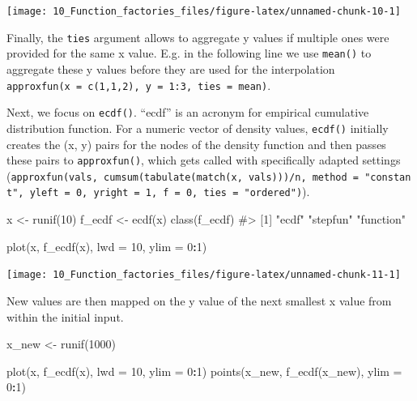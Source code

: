 \documentclass[
]{krantz}
\makeatletter
\newenvironment{Shaded}{\begin{snugshade}}{\end{snugshade}}
\newcommand{\CommentTok}[1]{\textcolor[rgb]{0.56,0.35,0.01}{\textit{#1}}}
\newcommand{\DataTypeTok}[1]{\textcolor[rgb]{0.13,0.29,0.53}{#1}}
\newcommand{\DecValTok}[1]{\textcolor[rgb]{0.00,0.00,0.81}{#1}}
\newcommand{\KeywordTok}[1]{\textcolor[rgb]{0.13,0.29,0.53}{\textbf{#1}}}
\newcommand{\NormalTok}[1]{#1}
\newcommand{\OperatorTok}[1]{\textcolor[rgb]{0.81,0.36,0.00}{\textbf{#1}}}
\newcommand{\StringTok}[1]{\textcolor[rgb]{0.31,0.60,0.02}{#1}}
\newenvironment{kframe}{%
\medskip{}
\setlength{\fboxsep}{.8em}
 \def\at@end@of@kframe{}%
 \ifinner\ifhmode%
  \def\at@end@of@kframe{\end{minipage}}%
  \begin{minipage}{\columnwidth}%
 \fi\fi%
 \def\FrameCommand##1{\hskip\@totalleftmargin \hskip-\fboxsep
 \colorbox{shadecolor}{##1}\hskip-\fboxsep
     \hskip-\linewidth \hskip-\@totalleftmargin \hskip\columnwidth}%
 \MakeFramed {\advance\hsize-\width
   \@totalleftmargin\z@ \linewidth\hsize
   \@setminipage}}%
 {\par\unskip\endMakeFramed%
 \at@end@of@kframe}
\renewenvironment{Shaded}{\begin{kframe}}{\end{kframe}}
\renewcommand{\KeywordTok} [1]{\textcolor[rgb]{0.00,0.44,0.13}{{#1}}}
\renewcommand{\DataTypeTok}[1]{\textcolor[rgb]{0.56,0.13,0.00}{{#1}}}
\renewcommand{\DecValTok}  [1]{\textcolor[rgb]{0.25,0.63,0.44}{{#1}}}
\renewcommand{\StringTok}  [1]{\textcolor[rgb]{0.25,0.44,0.63}{{#1}}}
\renewcommand{\CommentTok} [1]{\textcolor[rgb]{0.38,0.63,0.69}{{#1}}}
\renewcommand{\NormalTok}  [1]{{#1}}
\makeatother
\begin{document}
\begin{center}\texttt{[image: 10\_Function\_factories\_files/figure-latex/unnamed-chunk-10-1]} \end{center}

Finally, the \texttt{ties} argument allows to aggregate y values if multiple ones were provided for the same x value. E.g. in the following line we use \texttt{mean()} to aggregate these y values before they are used for the interpolation \texttt{approxfun(x\ =\ c(1,1,2),\ y\ =\ 1:3,\ ties\ =\ mean)}.

Next, we focus on \texttt{ecdf()}. ``ecdf'' is an acronym for empirical cumulative distribution function. For a numeric vector of density values, \texttt{ecdf()} initially creates the (x, y) pairs for the nodes of the density function and then passes these pairs to \texttt{approxfun()}, which gets called with specifically adapted settings (\texttt{approxfun(vals,\ cumsum(tabulate(match(x,\ vals)))/n,\ method\ =\ "constant",\ yleft\ =\ 0,\ yright\ =\ 1,\ f\ =\ 0,\ ties\ =\ "ordered")}).

\begin{Shaded}
\begin{Highlighting}[]
\NormalTok{x <-}\StringTok{ }\KeywordTok{runif}\NormalTok{(}\DecValTok{10}\NormalTok{)}
\NormalTok{f_ecdf <-}\StringTok{ }\KeywordTok{ecdf}\NormalTok{(x)}
\KeywordTok{class}\NormalTok{(f_ecdf)}
\CommentTok{#> [1] "ecdf"     "stepfun"  "function"}

\KeywordTok{plot}\NormalTok{(x, }\KeywordTok{f_ecdf}\NormalTok{(x), }\DataTypeTok{lwd =} \DecValTok{10}\NormalTok{, }\DataTypeTok{ylim =} \DecValTok{0}\OperatorTok{:}\DecValTok{1}\NormalTok{)}
\end{Highlighting}
\end{Shaded}

\begin{center}\texttt{[image: 10\_Function\_factories\_files/figure-latex/unnamed-chunk-11-1]} \end{center}

New values are then mapped on the y value of the next smallest x value from within the initial input.

\begin{Shaded}
\begin{Highlighting}[]
\NormalTok{x_new <-}\StringTok{ }\KeywordTok{runif}\NormalTok{(}\DecValTok{1000}\NormalTok{)}

\KeywordTok{plot}\NormalTok{(x, }\KeywordTok{f_ecdf}\NormalTok{(x), }\DataTypeTok{lwd =} \DecValTok{10}\NormalTok{, }\DataTypeTok{ylim =} \DecValTok{0}\OperatorTok{:}\DecValTok{1}\NormalTok{)}
\KeywordTok{points}\NormalTok{(x_new, }\KeywordTok{f_ecdf}\NormalTok{(x_new), }\DataTypeTok{ylim =} \DecValTok{0}\OperatorTok{:}\DecValTok{1}\NormalTok{)}
\end{Highlighting}
\end{Shaded}
\end{document}
